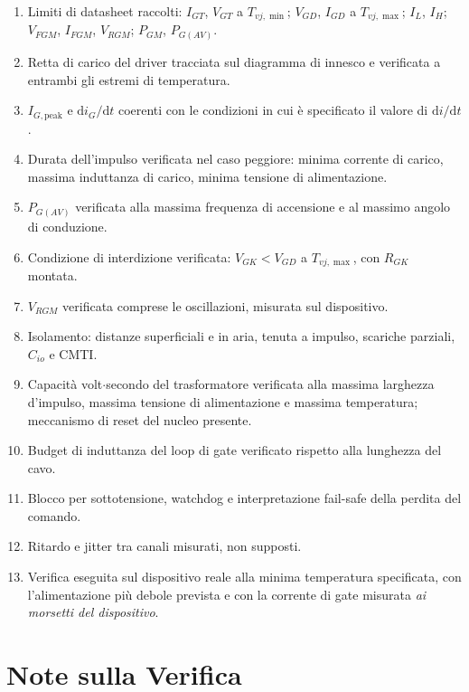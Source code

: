 \documentclass[11pt,a4paper]{article}
\begin{document}
\begin{enumerate}
  \item Limiti di datasheet raccolti: $I_{GT}$, $V_{GT}$ a $T_{vj,\min}$;
        $V_{GD}$, $I_{GD}$ a $T_{vj,\max}$; $I_L$, $I_H$; $V_{FGM}$, $I_{FGM}$,
        $V_{RGM}$; $P_{GM}$, $P_{G(AV)}$.
  \item Retta di carico del driver tracciata sul diagramma di innesco e verificata a
        entrambi gli estremi di temperatura.
  \item $I_{G,\text{peak}}$ e $\mathrm{d}i_G/\mathrm{d}t$ coerenti con le condizioni
        in cui è specificato il valore di $\mathrm{d}i/\mathrm{d}t$.
  \item Durata dell'impulso verificata nel caso peggiore: minima corrente di carico,
        massima induttanza di carico, minima tensione di alimentazione.
  \item $P_{G(AV)}$ verificata alla massima frequenza di accensione e al massimo
        angolo di conduzione.
  \item Condizione di interdizione verificata: $V_{GK} < V_{GD}$ a $T_{vj,\max}$,
        con $R_{GK}$ montata.
  \item $V_{RGM}$ verificata comprese le oscillazioni, misurata sul dispositivo.
  \item Isolamento: distanze superficiali e in aria, tenuta a impulso, scariche
        parziali, $C_{io}$ e CMTI.
  \item Capacità volt$\cdot$secondo del trasformatore verificata alla massima
        larghezza d'impulso, massima tensione di alimentazione e massima temperatura;
        meccanismo di reset del nucleo presente.
  \item Budget di induttanza del loop di gate verificato rispetto alla lunghezza del
        cavo.
  \item Blocco per sottotensione, watchdog e interpretazione fail-safe della perdita
        del comando.
  \item Ritardo e jitter tra canali misurati, non supposti.
  \item Verifica eseguita sul dispositivo reale alla minima temperatura specificata,
        con l'alimentazione più debole prevista e con la corrente di gate misurata
        \emph{ai morsetti del dispositivo}.
\end{enumerate}

\section*{Note sulla Verifica}
\end{document}
